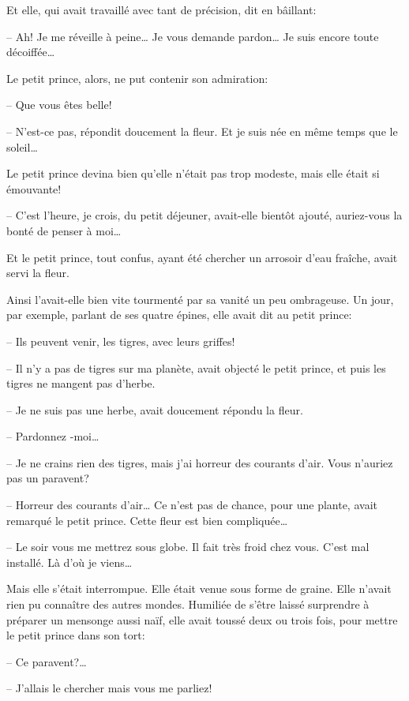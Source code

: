 \begin{Parallel}[p]{}{}
{Et elle, qui avait travaillé avec tant de précision,
dit en bâillant:

-- Ah! Je me réveille à peine\ldots{} Je vous demande
pardon\ldots{} Je suis encore toute décoiffée\ldots{}

Le petit prince, alors, ne put contenir son admiration:

-- Que vous êtes belle!

-- N'est-ce pas, répondit doucement la fleur. Et je suis née en même temps que le soleil\ldots{}

Le petit prince devina bien qu'elle n'était pas trop modeste, mais elle
était si émouvante!

-- C'est l'heure, je crois, du petit déjeuner, avait-elle bientôt ajouté, auriez-vous la bonté de penser à moi\ldots{}

Et le petit prince, tout confus, ayant été chercher
un arrosoir d'eau fraîche, avait servi la fleur.

\medskip

Ainsi l'avait-elle bien vite tourmenté par sa vanité un peu ombrageuse.
Un jour, par exemple, parlant de ses quatre épines,
elle avait dit au petit prince:

-- Ils peuvent venir, les tigres, avec leurs griffes!

-- Il n'y a pas de tigres sur ma planète, avait
objecté le petit prince, et puis les tigres ne mangent
pas d'herbe.

-- Je ne suis pas une herbe, avait doucement répondu la fleur.

-- Pardonnez -moi\ldots{}

-- Je ne crains rien des tigres, mais j'ai horreur
des courants d'air. Vous n'auriez pas un paravent?

-- Horreur des courants d'air\ldots{} Ce n'est pas de
chance, pour une plante, avait remarqué le petit
prince. Cette fleur est bien compliquée\ldots{}

-- Le soir vous me mettrez sous globe. Il fait très froid chez vous.
C'est mal installé. Là d'où je viens\ldots{}

Mais elle s'était interrompue. Elle était venue sous
forme de graine. Elle n'avait rien pu connaître des autres mondes.
Humiliée de s'être laissé surprendre à préparer un mensonge aussi naïf, elle avait toussé
deux ou trois fois, pour mettre le petit prince dans son tort:

-- Ce paravent?\ldots{}

-- J'allais le chercher mais vous me parliez!

}
\end{Parallel}
